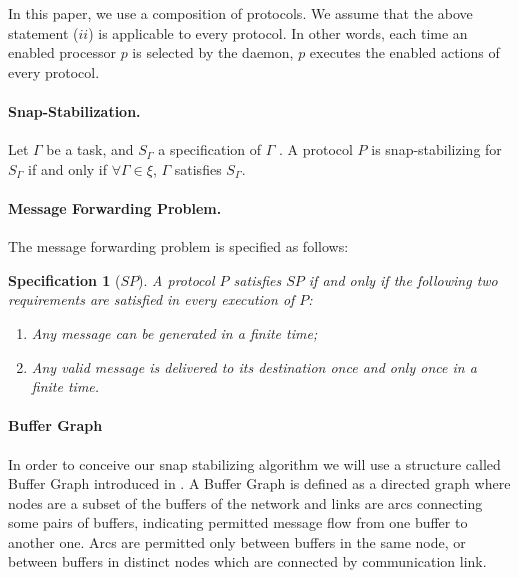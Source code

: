 \documentclass{llncs}
\newtheorem{specification}{Specification}
\begin{document}
In this paper, we use a composition of protocols.  We assume that the above statement ($ii$) is applicable to every
protocol. In other words, each time an enabled processor $p$ is selected by the daemon, $p$ executes the enabled actions of every protocol.










\paragraph{\textbf{Snap-Stabilization}.} 
Let $\Gamma$ be a task, and $S_{\Gamma}$ a specification of $\Gamma$ . A protocol $P$ is snap-stabilizing for $S_{\Gamma}$ if and only if $\forall \Gamma \in \xi$, $\Gamma$ satisfies $S_{\Gamma}$.



\paragraph{\textbf{Message Forwarding Problem}.}



The message forwarding problem is specified as follows: 

\begin{specification}[$SP$]\label{spec:SP}
A protocol $P$ satisfies $SP$ if and only if the following two requirements are satisfied in every execution of $P$:
\begin{enumerate}
\item Any message can be generated in a finite time;
\item Any valid message is delivered to its destination once and only once in a finite time.
\end{enumerate}
\end{specification}



\paragraph{\textbf{Buffer Graph}} 



In order to conceive our snap stabilizing algorithm we will use a structure called Buffer Graph introduced in \cite{MS78}. A Buffer Graph is defined as a directed graph where nodes are a subset of the buffers of the network and links are arcs connecting some pairs of buffers, indicating permitted message flow from one buffer to another one. Arcs are permitted only between buffers in the same node, or between buffers in distinct nodes which are connected by communication link.
\end{document}
